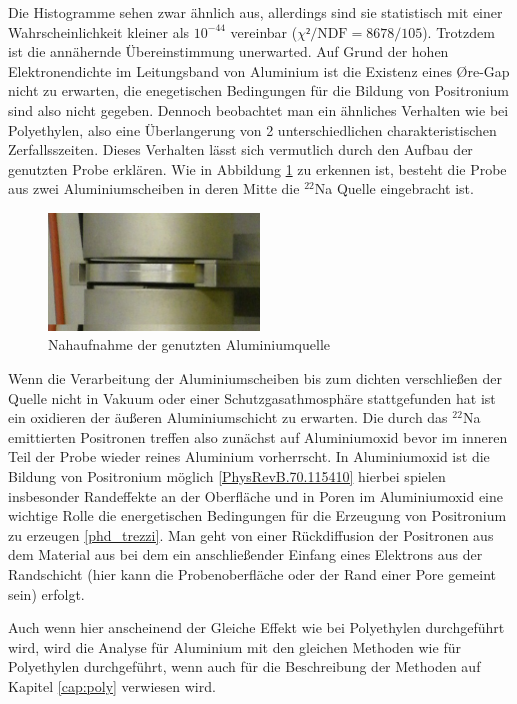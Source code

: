 \documentclass[a4paper,12pt]{article}
\begin{document}
Die Histogramme sehen zwar ähnlich aus, allerdings sind sie statistisch mit einer Wahrscheinlichkeit
kleiner als $10^{-44}$ vereinbar ($χ²/\text{NDF} = 8678/105$).
Trotzdem ist die annähernde Übereinstimmung unerwarted. Auf Grund der hohen Elektronendichte im Leitungsband von Aluminium ist die Existenz eines Øre-Gap nicht zu erwarten, die 
enegetischen Bedingungen für die Bildung von Positronium sind also nicht gegeben. Dennoch beobachtet man ein ähnliches Verhalten wie bei 
Polyethylen, also eine Überlangerung von 2 unterschiedlichen charakteristischen Zerfallsszeiten. Dieses Verhalten lässt sich vermutlich durch
den Aufbau der genutzten Probe erklären.
Wie in Abbildung \ref{fig:quelle_nah} zu erkennen ist,
besteht die Probe aus zwei Aluminiumscheiben in deren Mitte die $^{22}$Na Quelle eingebracht ist.
\begin{figure}
	\centering
	\includegraphics[width=0.5\textwidth]{../pictures/quelle_nah.jpg}
	\caption{Nahaufnahme der genutzten Aluminiumquelle }
	\label{fig:quelle_nah}
\end{figure}


Wenn die Verarbeitung der Aluminiumscheiben bis zum dichten verschließen der Quelle nicht
in Vakuum oder einer Schutzgasathmosphäre stattgefunden hat ist ein oxidieren der äußeren Aluminiumschicht zu erwarten. Die durch das $^{22}$Na
emittierten Positronen treffen also zunächst auf Aluminiumoxid bevor im inneren Teil der Probe wieder reines Aluminium vorherrscht. In Aluminiumoxid
ist die Bildung von Positronium möglich \ref{PhysRevB.70.115410} hierbei spielen insbesonder Randeffekte an der Oberfläche und in Poren im
Aluminiumoxid eine wichtige Rolle die energetischen Bedingungen für die Erzeugung von Positronium zu erzeugen \ref{phd_trezzi}. Man geht von
einer Rückdiffusion der Positronen aus dem Material aus bei dem ein anschließender Einfang eines Elektrons aus der Randschicht 
(hier kann die Probenoberfläche oder der Rand einer Pore gemeint sein) erfolgt.

Auch wenn hier anscheinend der Gleiche Effekt wie bei Polyethylen durchgeführt wird, wird die
Analyse für Aluminium mit den gleichen Methoden wie für Polyethylen durchgeführt, wenn auch für die
Beschreibung der Methoden auf Kapitel \ref{cap:poly} verwiesen wird.
\end{document}
